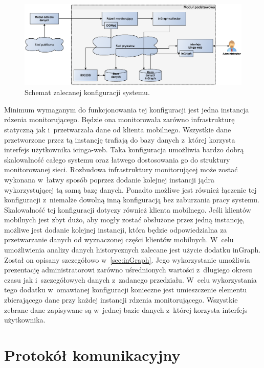 \begin{figure}[ht]
\centering
  \caption{Schemat zalecanej konfiguracji systemu.}
  \label{fig:modulPodstawowy}
\includegraphics[width=1\textwidth]{img/modulPodstawowy}
\end{figure}

Minimum wymaganym do funkcjonowania tej konfiguracji jest jedna
instancja rdzenia monitorującego. Będzie ona monitorowała zarówno
infrastrukturę statyczną jak i~przetwarzała dane od klienta
mobilnego. Wszystkie dane przetworzone przez tą instancję trafiają do
bazy danych z~której korzysta interfejs użytkownika icinga-web. Taka
konfiguracja umożliwia bardzo dobrą skalowalność całego systemu oraz
łatwego dostosowania go do struktury monitorowanej sieci. Rozbudowa
infrastruktury monitorującej może zostać wykonana w~łatwy sposób
poprzez dodanie kolejnej instancji jądra wykorzystującej tą samą bazę
danych. Ponadto możliwe jest również łączenie tej konfiguracji
z~niemalże dowolną inną konfiguracją bez zaburzania pracy
systemu. Skalowalność tej konfiguracji dotyczy również klienta
mobilnego. Jeśli klientów mobilnych jest zbyt dużo, aby mogły zostać
obsłużone przez jedną instancję, możliwe jest dodanie kolejnej
instancji, która będzie odpowiedzialna za przetwarzanie danych od
wyznaczonej części klientów mobilnych. W~celu umożliwienia analizy
danych historycznych zalecane jest użycie dodatku inGraph. Został on
opisany szczegółowo w~\ref{sec:inGraph}. Jego wykorzystanie umożliwia
prezentację administratorowi zarówno uśrednionych wartości z~długiego
okresu czasu jak i~szczegółowych danych z~zadanego przedziału. W~celu
wykorzystania tego dodatku w~omawianej konfiguracji konieczne jest
umieszczenie elementu zbierającego dane przy każdej instancji rdzenia
monitorującego. Wszystkie zebrane dane zapisywane są w~jednej bazie
danych z~której korzysta interfejs użytkownika.



\section[Protokół komunikacyjny][Protokół komunikacyjny]{Protokół komunikacyjny}
\label{sec:ProtKom}

